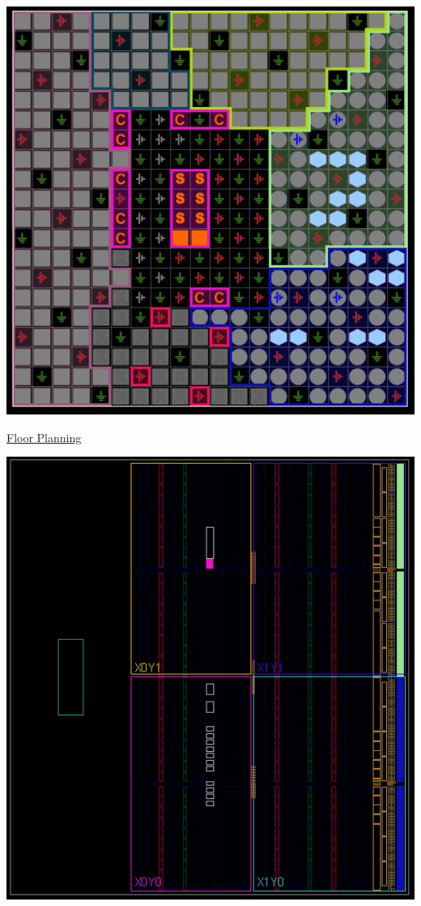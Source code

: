 \documentclass[11pt]{article}
\begin{document}
\begin{center}
    \includegraphics[width = 1\textwidth]{IOPlanning.png}

    \newpage

    \underline{Floor Planning}

    \includegraphics[width = 1\textwidth]{FloorPlan.png}


\end{center}
\end{document}
